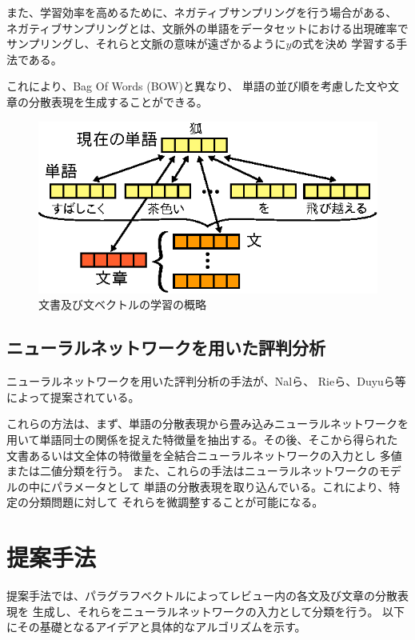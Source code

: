 \documentclass[twocolumn,a4paper]{ltjarticle}
\makeatletter
\let\tti@includegraphics\includegraphics
\renewcommand{\includegraphics}[1]{%
    \tti@includegraphics[width=\linewidth]{#1}}
\makeatother
\begin{document}
また、学習効率を高めるために、ネガティブサンプリングを行う場合がある、
ネガティブサンプリングとは、文脈外の単語をデータセットにおける出現確率で
サンプリングし、それらと文脈の意味が遠ざかるように$y$の式を決め
学習する手法である。

これにより、Bag Of Words (BOW)と異なり、
単語の並び順を考慮した文や文章の分散表現を生成することができる。

\begin{figure}
  \includegraphics{fig/dvsvwv.eps}
  \caption{文書及び文ベクトルの学習の概略}
  \label{fig:ParagraphVector}
\end{figure}


\subsection{ニューラルネットワークを用いた評判分析}

 ニューラルネットワークを用いた評判分析の手法が、Nalら\cite{nal14}、
Rieら\cite{rie14}、Duyuら\cite{duyu15}等によって提案されている。

 これらの方法は、まず、単語の分散表現から畳み込みニューラルネットワークを
用いて単語同士の関係を捉えた特徴量を抽出する。その後、そこから得られた
文書あるいは文全体の特徴量を全結合ニューラルネットワークの入力とし
多値または二値分類を行う。
また、これらの手法はニューラルネットワークのモデルの中にパラメータとして
単語の分散表現を取り込んでいる。これにより、特定の分類問題に対して
それらを微調整することが可能になる。



\section{提案手法}

提案手法では、パラグラフベクトルによってレビュー内の各文及び文章の分散表現を
生成し、それらをニューラルネットワークの入力として分類を行う。
以下にその基礎となるアイデアと具体的なアルゴリズムを示す。
\end{document}
